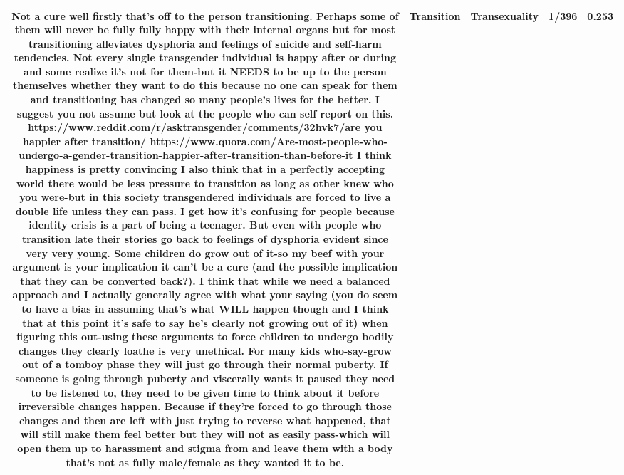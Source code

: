 \documentclass[11pt]{article}
\newlength\mylength
\begin{document}
\begin{center}
\begin{longtable}{|C{.40\mylength}|C{.30\mylength}|C{.15\mylength}|C{.15\mylength}|C{.15\mylength}|}
   Not a cure  well firstly that's off to the person transitioning. Perhaps some of them will never be fully fully happy with their internal organs but for most transitioning alleviates dysphoria and feelings of suicide and self-harm tendencies. Not every single transgender individual is happy after or during and some realize it's not for them-but it NEEDS to be up to the person themselves whether they want to do this because no one can speak for them and transitioning has changed so many people's lives for the better. I suggest you not assume but look at the people who can self report on this. https://www.reddit.com/r/asktransgender/comments/32hvk7/are you happier after transition/ https://www.quora.com/Are-most-people-who-undergo-a-gender-transition-happier-after-transition-than-before-it I think happiness is pretty convincing I also think that in a perfectly accepting world there would be less pressure to transition as long as other knew who you were-but in this society transgendered individuals are forced to live a double life unless they can pass. I get how it's confusing for people because identity crisis is a part of being a teenager. But even with people who transition late their stories go back to feelings of dysphoria evident since very very young. Some children do grow out of it-so my beef with your argument is your implication it can't be a cure (and the possible implication that they can be converted back?). I think that while we need a balanced approach and I actually generally agree with what your saying (you do seem to have a bias in assuming that's what WILL happen though and I think that at this point it's safe to say he's clearly not growing out of it) when figuring this out-using these arguments to force children to undergo bodily changes they clearly loathe is very unethical. For many kids who-say-grow out of a tomboy phase they will just go through their normal puberty. If someone is going through puberty and viscerally wants it paused they need to be listened to, they need to be given time to think about it before irreversible changes happen. Because if they're forced to go through those changes and then are left with just trying to reverse what happened, that will still make them feel better but they will not as easily pass-which will open them up to harassment and stigma from and leave them with a body that's not as fully male/female as they wanted it to be.  & Transition & Transexuality & 1/396 & 0.253 \\  \hline

\end{longtable}
\end{center}
\end{document}
